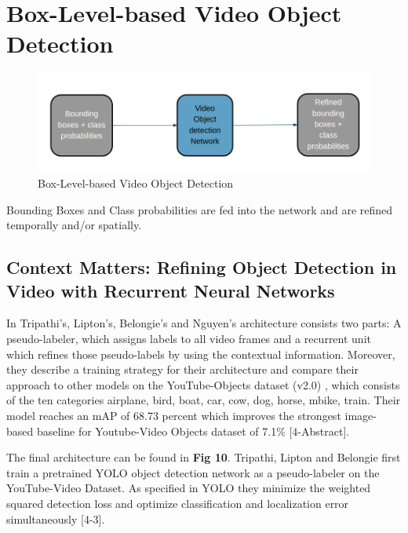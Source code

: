 \documentclass[conference]{IEEEtran}
\begin{document}
\section{Box-Level-based Video Object Detection}

\begin{figure}[h]
\includegraphics[width=\columnwidth]{box-level-basic}
\caption{Box-Level-based Video Object Detection}
\end{figure}
Bounding Boxes and Class probabilities are fed into the network and are refined temporally and/or spatially.

\subsection{Context Matters: Refining Object Detection in Video with Recurrent Neural Networks \cite{b4}}
In \cite{b4} Tripathi's, Lipton's, Belongie's and Nguyen's architecture consists two parts: A pseudo-labeler, which assigns labels to all video frames and a recurrent unit which refines those pseudo-labels by using the contextual information. Moreover, they describe a training strategy for their architecture and compare their approach to other models on the YouTube-Objects dataset (v2.0) \cite{b25} , which consists of the ten categories airplane, bird, boat, car, cow, dog, horse, mbike, train. Their model reaches an mAP of 68.73 percent which improves the strongest image-based baseline for Youtube-Video Objects dataset of 7.1\% [4-Abstract]. \newline

The final architecture can be found in \textbf{Fig 10}. Tripathi, Lipton and Belongie first train a pretrained YOLO object detection network \cite{b20} as a  pseudo-labeler on the YouTube-Video Dataset. As specified in YOLO  they minimize the weighted squared detection loss and optimize classification and localization error simultaneously [4-3]. 
\end{document}

